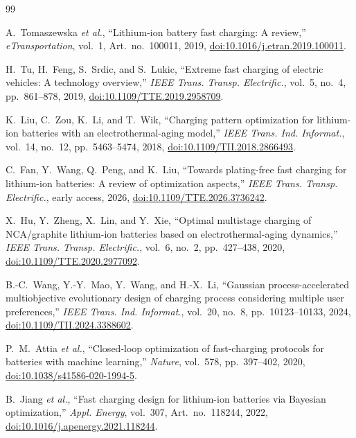 \documentclass[journal]{IEEEtran}
\begin{document}
\begin{thebibliography}{99}

A.~Tomaszewska \textit{et al.},
``Lithium-ion battery fast charging: A review,''
\textit{eTransportation}, vol.~1, Art.~no.~100011, 2019,
\href{https://doi.org/10.1016/j.etran.2019.100011}
{doi:10.1016/j.etran.2019.100011}.

H.~Tu, H.~Feng, S.~Srdic, and S.~Lukic,
``Extreme fast charging of electric vehicles: A technology overview,''
\textit{IEEE Trans. Transp. Electrific.},
vol.~5, no.~4, pp.~861--878, 2019,
\href{https://doi.org/10.1109/TTE.2019.2958709}
{doi:10.1109/TTE.2019.2958709}.

K.~Liu, C.~Zou, K.~Li, and T.~Wik,
``Charging pattern optimization for lithium-ion batteries with an
electrothermal-aging model,''
\textit{IEEE Trans. Ind. Informat.},
vol.~14, no.~12, pp.~5463--5474, 2018,
\href{https://doi.org/10.1109/TII.2018.2866493}
{doi:10.1109/TII.2018.2866493}.

C.~Fan, Y.~Wang, Q.~Peng, and K.~Liu,
``Towards plating-free fast charging for lithium-ion batteries:
A review of optimization aspects,''
\textit{IEEE Trans. Transp. Electrific.},
early access, 2026,
\href{https://doi.org/10.1109/TTE.2026.3736242}
{doi:10.1109/TTE.2026.3736242}.

X.~Hu, Y.~Zheng, X.~Lin, and Y.~Xie,
``Optimal multistage charging of NCA/graphite lithium-ion batteries
based on electrothermal-aging dynamics,''
\textit{IEEE Trans. Transp. Electrific.},
vol.~6, no.~2, pp.~427--438, 2020,
\href{https://doi.org/10.1109/TTE.2020.2977092}
{doi:10.1109/TTE.2020.2977092}.

B.-C.~Wang, Y.-Y.~Mao, Y.~Wang, and H.-X.~Li,
``Gaussian process-accelerated multiobjective evolutionary design
of charging process considering multiple user preferences,''
\textit{IEEE Trans. Ind. Informat.},
vol.~20, no.~8, pp.~10123--10133, 2024,
\href{https://doi.org/10.1109/TII.2024.3388602}
{doi:10.1109/TII.2024.3388602}.

P.~M.~Attia \textit{et al.},
``Closed-loop optimization of fast-charging protocols for batteries
with machine learning,''
\textit{Nature}, vol.~578, pp.~397--402, 2020,
\href{https://doi.org/10.1038/s41586-020-1994-5}
{doi:10.1038/s41586-020-1994-5}.

B.~Jiang \textit{et al.},
``Fast charging design for lithium-ion batteries via Bayesian
optimization,''
\textit{Appl. Energy}, vol.~307, Art.~no.~118244, 2022,
\href{https://doi.org/10.1016/j.apenergy.2021.118244}
{doi:10.1016/j.apenergy.2021.118244}.


\end{thebibliography}
\end{document}
